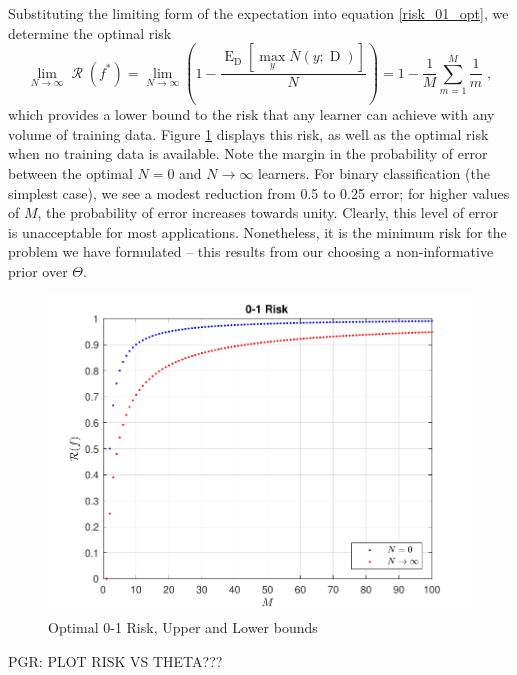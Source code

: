 \documentclass[12pt]{report}
\DeclareMathOperator{\Drm}{\mathrm{D}}
\DeclareMathOperator{\Erm}{\mathrm{E}}
\DeclareMathOperator{\Rcal}{\mathcal{R}}
\begin{document}
Substituting the limiting form of the expectation into equation \eqref{risk_01_opt}, we determine the optimal risk
\begin{equation}
\lim_{N \to \infty} \Rcal(f^*)  = \lim_{N \to \infty} \left( 1 - \frac{\Erm_{\Drm} \left[ \max_y \bar{N}(y;\Drm) \right]}{N} \right) = 1 - \frac{1}{M} \sum_{m=1}^M \frac{1}{m} \;,
\end{equation}
which provides a lower bound to the risk that any learner can achieve with any volume of training data. Figure \ref{fig:Risk_01_LB} displays this risk, as well as the optimal risk when no training data is available. Note the margin in the probability of error between the optimal $N=0$ and $N \to \infty$ learners. For binary classification (the simplest case), we see a modest reduction from 0.5 to 0.25 error; for higher values of $M$, the probability of error increases towards unity. Clearly, this level of error is unacceptable for most applications. Nonetheless, it is the minimum risk for the problem we have formulated -- this results from our choosing a non-informative prior over $\Theta$.

\begin{figure}
\centering
\includegraphics[scale=1.0]{Risk_01_LB.pdf}
\caption{Optimal 0-1 Risk, Upper and Lower bounds}
\label{fig:Risk_01_LB}
\end{figure}

PGR: PLOT RISK VS THETA???
\end{document}
